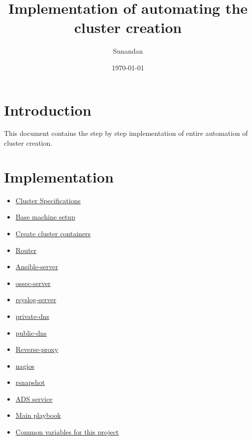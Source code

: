 \documentclass[11pt]{article}
\title{Implementation of automating the cluster creation}
\author{Sunandan}
\date{\today}
\begin{document}
\maketitle

\setcounter{tocdepth}{3}
\tableofcontents
\vspace*{1cm}

\section{Introduction}
\label{sec-1}

  This document contains the step by step implementation of entire automation of cluster
  creation.
\section{Implementation}
\label{sec-2}

\begin{itemize}
\item \href{file:///home/sunandan/Desktop/internship/cluster-automation/src/imp/spec/index.org}{Cluster Specifications}
\item \href{file:///home/sunandan/Desktop/internship/cluster-automation/src/imp/base-setup.org}{Base machine setup}
\item \href{file:///home/sunandan/Desktop/internship/cluster-automation/src/imp/create-cluster-containers.org}{Create cluster containers}
\item \href{file:///home/sunandan/Desktop/internship/cluster-automation/src/imp/router.org}{Router}
\item \href{file:///home/sunandan/Desktop/internship/cluster-automation/src/imp/ansible-server.org}{Ansible-server}
\item \href{file:///home/sunandan/Desktop/internship/cluster-automation/src/imp/ossec-server.org}{ossec-server}
\item \href{file:///home/sunandan/Desktop/internship/cluster-automation/src/imp/rsyslog-server.org}{rsyslog-server}
\item \href{file:///home/sunandan/Desktop/internship/cluster-automation/src/imp/private-dns.org}{private-dns}
\item \href{file:///home/sunandan/Desktop/internship/cluster-automation/src/imp/public-dns.org}{public-dns}
\item \href{file:///home/sunandan/Desktop/internship/cluster-automation/src/imp/reverse-proxy-awstats.org}{Reverse-proxy}
\item \href{file:///home/sunandan/Desktop/internship/cluster-automation/src/imp/nagios.org}{nagios}
\item \href{file:///home/sunandan/Desktop/internship/cluster-automation/src/imp/rsnapshot-server.org}{rsnapshot}
\item \href{file:///home/sunandan/Desktop/internship/cluster-automation/src/imp/ads.org}{ADS service}
\item \href{file:///home/sunandan/Desktop/internship/cluster-automation/src/imp/main.org}{Main playbook}
\item \href{file:///home/sunandan/Desktop/internship/cluster-automation/src/imp/common-vars.org}{Common variables for this project}
\end{itemize}
\end{document}
